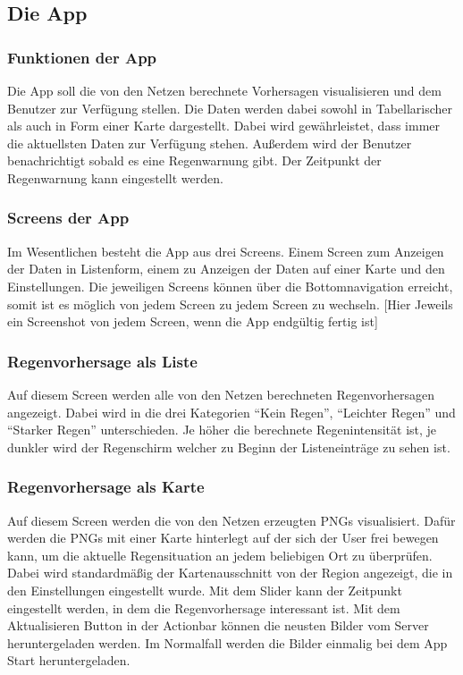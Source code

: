 \subsection{Die App}\label{die app}

\subsubsection{Funktionen der App}\label{funkionen der app}
Die App soll die von den Netzen berechnete Vorhersagen visualisieren und dem Benutzer zur Verfügung stellen. Die Daten werden dabei sowohl in 
Tabellarischer als auch in Form einer Karte dargestellt. Dabei wird gewährleistet, dass immer die aktuellsten Daten zur Verfügung stehen. 
Außerdem wird der Benutzer benachrichtigt sobald es eine Regenwarnung gibt. Der Zeitpunkt der Regenwarnung kann eingestellt werden.

\subsubsection{Screens der App}\label{screens der app}
Im Wesentlichen besteht die App aus drei Screens. Einem Screen zum Anzeigen der Daten in Listenform, einem zu Anzeigen der Daten auf einer Karte und 
den Einstellungen. Die jeweiligen Screens können über die Bottomnavigation erreicht, somit ist es möglich von jedem Screen zu jedem Screen zu wechseln.   
[Hier Jeweils ein Screenshot von jedem Screen, wenn die App endgültig fertig ist]  

\subsubsection*{Regenvorhersage als Liste}
Auf diesem Screen werden alle von den Netzen berechneten Regenvorhersagen angezeigt. Dabei wird in die drei Kategorien “Kein Regen”, “Leichter Regen” 
und “Starker Regen” unterschieden. Je höher die berechnete Regenintensität ist, je dunkler wird der Regenschirm welcher zu Beginn der Listeneinträge zu 
sehen ist.   

\subsubsection*{Regenvorhersage als Karte}
Auf diesem Screen werden die von den Netzen erzeugten PNGs visualisiert. Dafür werden die PNGs mit einer Karte hinterlegt auf der sich der User frei 
bewegen kann, um die aktuelle Regensituation an jedem beliebigen Ort zu überprüfen. Dabei wird standardmäßig der Kartenausschnitt von der Region angezeigt, 
die in den Einstellungen eingestellt wurde. Mit dem Slider kann der Zeitpunkt eingestellt werden, in dem die Regenvorhersage interessant ist. Mit dem 
Aktualisieren Button in der Actionbar können die neusten Bilder vom Server heruntergeladen werden. Im Normalfall werden die Bilder einmalig bei dem 
App Start heruntergeladen.  

